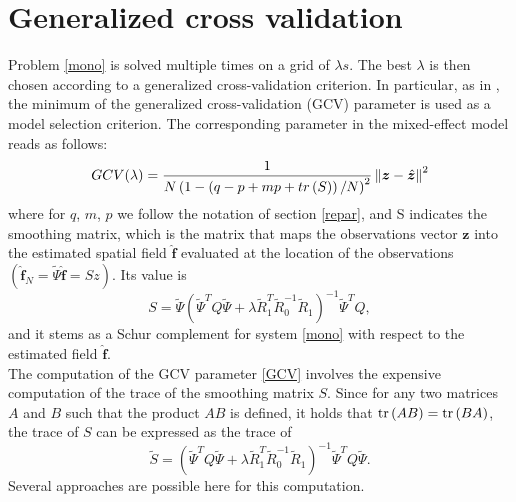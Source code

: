 \section{Generalized cross validation}
Problem \ref{mono} is solved multiple times on a grid of $\lambda s$. The best
$\lambda$ is then chosen according to a generalized cross-validation criterion.
In particular, as in \cite{sangalli1}, the minimum of the generalized
cross-validation (GCV) parameter is used as a model selection criterion. The
corresponding parameter in the mixed-effect model reads as follows:
\begin{equation}
	\label{GCV}
	GCV(\lambda) = \frac{1}{N\left(1-\left(q-p+mp+tr\left(S\right)\right)/N\right)^2}\left\|\bm{z} - \hat{\bm{z}}\right\|^2
\end{equation}
where for $q$, $m$, $p$ we follow the notation of section
\ref{repar}, and S indicates the smoothing matrix, which is the matrix that
maps the observations vector $\bm{z}$ into the estimated spatial field
$\hat{\bm{f}}$ evaluated at the location of the observations $(\hat{\bm{f}}_N =
	\tilde{\Psi}\hat{\bm{f}} = S z)$. Its value is
\begin{equation}
	S = \tilde{\Psi} \left(\tilde{\Psi}^TQ\tilde{\Psi} + \lambda \tilde{R}_1^T
	\tilde{R}_0^{-1} \tilde{R}_1\right)^{-1}\tilde{\Psi}^TQ,
\end{equation}
and it stems as a Schur complement for system \ref{mono} with respect
to the estimated field $\hat{\bm{f}}$.\\ The computation of the GCV parameter
\ref{GCV} involves the expensive computation of the trace of the smoothing
matrix $S$. Since for any two matrices $A$ and $B$ such that the product $AB$
is defined, it holds that $\operatorname*{tr} \left(AB\right) = \operatorname*{tr} \left(BA\right)$,
the trace of $S$ can be expressed as the trace of
\begin{equation}
	\label{s_tilda}
	\tilde{S} = \left(\tilde{\Psi}^TQ\tilde{\Psi} + \lambda \tilde{R}_1^T
	\tilde{R}_0^{-1} \tilde{R}_1\right)^{-1}\tilde{\Psi}^TQ \tilde{\Psi}.
\end{equation}
Several approaches are possible here for this computation.
